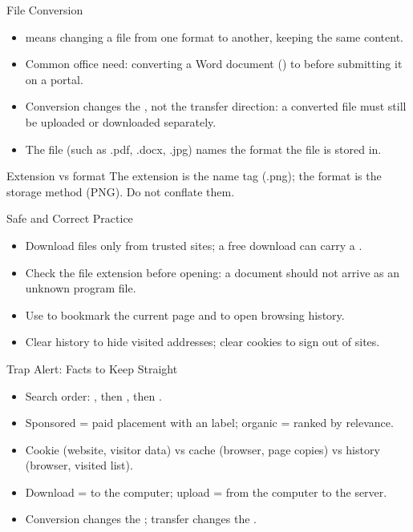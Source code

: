 \documentclass[aspectratio=169]{beamer}
\begin{document}
\begin{frame}{File Conversion}
  \begin{itemize}
    \item {} means changing a file from one format to
      another, keeping the same content.
    \item Common office need: converting a Word document () to
       before submitting it on a portal.
    \item Conversion changes the , not the transfer direction:
      a converted file must still be uploaded or downloaded separately.
    \item The file  (such as .pdf, .docx, .jpg) names the
      format the file is stored in.
  \end{itemize}
  \begin{block}{Extension vs format}
    The extension is the name tag (.png); the format is the storage method
    (PNG). Do not conflate them.
  \end{block}
\end{frame}

\begin{frame}{Safe and Correct Practice}
  \begin{itemize}
    \item Download files only from trusted sites; a free download can carry
      a .
    \item Check the file extension before opening: a document should not
      arrive as an unknown program file.
    \item Use  to bookmark the current page and  to
      open browsing history.
    \item Clear history to hide visited addresses; clear cookies to sign
      out of sites.
  \end{itemize}
\end{frame}

\begin{frame}{Trap Alert: Facts to Keep Straight}
  \begin{itemize}
    \item Search order: , then , then .
    \item Sponsored = paid placement with an  label; organic =
      ranked by relevance.
    \item Cookie (website, visitor data) vs cache (browser, page copies)
      vs history (browser, visited list).
    \item Download = to the computer; upload = from the computer to the
      server.
    \item Conversion changes the ; transfer changes the
      .
  \end{itemize}
\end{frame}
\end{document}
